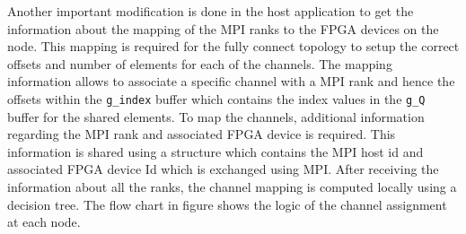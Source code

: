 Another important modification is done in the host application to get the information about
the mapping of the MPI ranks to the FPGA devices on the node. This mapping is required for the
fully connect topology to setup the correct offsets and number of elements for each of the channels.
The mapping information allows to associate a specific channel with a MPI rank and hence the
offsets within the \texttt{g\_index} buffer which contains the index values in the \texttt{g\_Q}
buffer for the shared elements. To map the channels, additional information
regarding the MPI rank and associated FPGA device is required. This information is shared using
a structure which contains the MPI host id and associated FPGA device Id which is exchanged
using MPI. After receiving the information about all the ranks, the channel mapping
is computed locally using a decision tree. The flow chart in figure 
shows the logic of the channel assignment at each node.